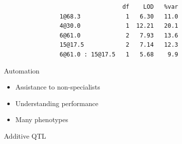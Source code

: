 \documentclass[12pt]{article}
\newcommand{\headsize}{\fontsize{35}{35} \selectfont}
\newcommand{\smallersize}{\fontsize{20}{25} \selectfont}
\begin{document}
\vspace{40mm}

\color{mywhite} \smallersize

\begin{verbatim}
                                  df    LOD   %var
                1@68.3             1   6.30   11.0
                4@30.0             1  12.21   20.1
                6@61.0             2   7.93   13.6
                15@17.5            2   7.14   12.3
                6@61.0 : 15@17.5   1   5.68    9.9
\end{verbatim}




\newpage

\headsize \color{myyellow}
\hfill \begin{minipage}{5.75in}
\centering
Automation
\end{minipage}

\vspace{3cm} \color{mywhite} \smallersize

\hfill \begin{minipage}{10in}
\begin{itemize}
\itemsep24pt

\item Assistance to non-specialists

\item Understanding performance

\item Many phenotypes

\end{itemize}
\end{minipage}


\newpage


\headsize \color{myyellow}
\hfill \begin{minipage}{5.75in}
\centering
Additive QTL
\end{minipage}

\vspace{2cm} \color{mywhite} \smallersize
\end{document}

